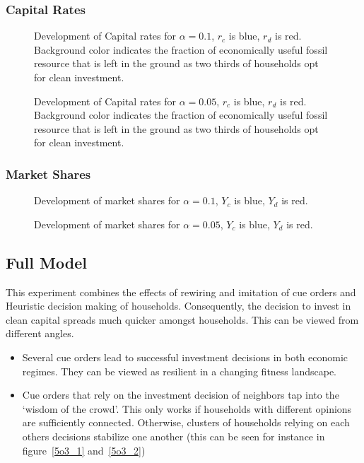 \subsubsection{Capital Rates}
\begin{figure}[t]
	\centering
	\caption{Development of Capital rates for $\alpha=0.1$, $r_c$ is blue, $r_d$ is red. Background color indicates the fraction of economically useful fossil resource that is left in the ground as two thirds of households opt for clean investment.}
	\label{5o3_3}
\end{figure}

\begin{figure}[t]
	\centering
	\caption{Development of Capital rates for $\alpha=0.05$, $r_c$ is blue, $r_d$ is red. Background color indicates the fraction of economically useful fossil resource that is left in the ground as two thirds of households opt for clean investment.}

\end{figure}
\subsubsection{Market Shares}
\begin{figure}[t]
	\centering
	\caption{Development of market shares for $\alpha=0.1$, $Y_c$ is blue, $Y_d$ is red.}

\end{figure}

\begin{figure}[t]
	\centering
	\caption{Development of market shares for $\alpha=0.05$, $Y_c$ is blue, $Y_d$ is red.}

\end{figure}


\subsection{Full Model}
This experiment combines the effects of rewiring and imitation of cue orders and Heuristic decision making of households. Consequently, the decision to invest in clean capital spreads much quicker amongst households. This can be viewed from different angles.
\begin{itemize}
	\item Several cue orders lead to successful investment decisions in both economic regimes. They can be viewed as resilient in a changing fitness landscape.
	\item Cue orders that rely on the investment decision of neighbors tap into the `wisdom of the crowd'. This only works if households with different opinions are sufficiently connected. Otherwise, clusters of households relying on each others decisions stabilize one another (this can be seen for instance in figure~\ref{5o3_1} and~\ref{5o3_2})
\end{itemize}

